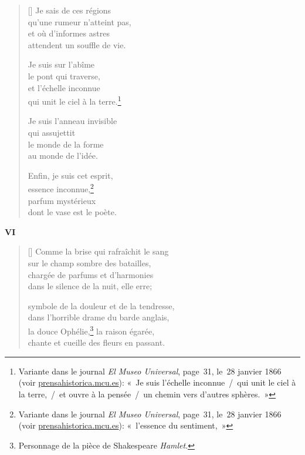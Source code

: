 \documentclass[a4paper,12pt]{book}
\begin{document}
\begin{verse}[\versewidth]
  Je sais de ces régions \\
  qu'une rumeur n'atteint pas, \\
  et où d'informes astres \\
  attendent un souffle de vie.

  Je suis sur l'abîme \\
  le pont qui traverse, \\
  et l'échelle inconnue \\
  qui unit le ciel à la terre.\footnote{Variante dans le journal
  \emph{El Museo Universal}, page~31, le~28 janvier 1866 (voir
  \url{prensahistorica.mcu.es}): «~Je suis l'échelle inconnue~/~qui unit
  le ciel à la terre,~/~et ouvre à la pensée~/~un chemin vers d'autres
  sphères.~»}

  Je suis l'anneau invisible \\
  qui assujettit \\
  le monde de la forme \\
  au monde de l'idée.

  Enfin, je suis cet esprit, \\
  essence inconnue,\footnote{Variante dans le journal
  \emph{El Museo Universal}, page~31, le~28 janvier 1866 (voir
  \url{prensahistorica.mcu.es}): «~l'essence du sentiment,~»} \\
  parfum mystérieux \\
  dont le vase est le poète.
\end{verse}

\bigskip

\begin{center}
  \textbf{VI}
\end{center}

\settowidth{\versewidth}{chante et cueille des fleurs en passant.}

\begin{verse}[\versewidth]
  Comme la brise qui rafraîchit le sang \\
  sur le champ sombre des batailles, \\
  chargée de parfums et d'harmonies \\
  dans le silence de la nuit, elle erre;

  symbole de la douleur et de la tendresse, \\
  dans l'horrible drame du barde anglais, \\
  la douce Ophélie,\footnote{Personnage de la pièce de Shakespeare \emph{Hamlet}.} la raison égarée, \\
  chante et cueille des fleurs en passant.
\end{verse}
\end{document}
